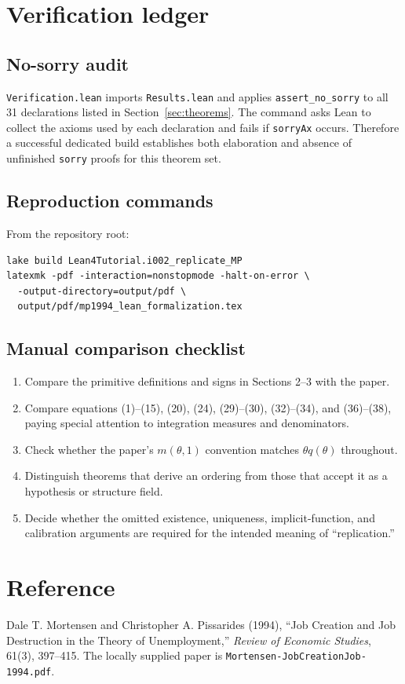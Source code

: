 \documentclass[11pt]{article}
\newcommand{\code}[1]{\texttt{#1}}
\newcommand{\leanfile}[1]{\texttt{#1}}
\begin{document}
\section{Verification ledger}

\subsection{No-sorry audit}

\leanfile{Verification.lean} imports \leanfile{Results.lean} and applies
\code{assert\_no\_sorry} to all 31 declarations listed in
Section~\ref{sec:theorems}. The command asks Lean to collect the axioms used by each
declaration and fails if \code{sorryAx} occurs. Therefore a successful dedicated
build establishes both elaboration and absence of unfinished \code{sorry} proofs for
this theorem set.

\subsection{Reproduction commands}

From the repository root:
\begin{verbatim}
lake build Lean4Tutorial.i002_replicate_MP
latexmk -pdf -interaction=nonstopmode -halt-on-error \
  -output-directory=output/pdf \
  output/pdf/mp1994_lean_formalization.tex
\end{verbatim}

\subsection{Manual comparison checklist}

\begin{enumerate}
  \item Compare the primitive definitions and signs in Sections 2--3 with the paper.
  \item Compare equations (1)--(15), (20), (24), (29)--(30), (32)--(34), and
        (36)--(38), paying special attention to integration measures and denominators.
  \item Check whether the paper's $m(\theta,1)$ convention matches
        $\theta q(\theta)$ throughout.
  \item Distinguish theorems that derive an ordering from those that accept it as a
        hypothesis or structure field.
  \item Decide whether the omitted existence, uniqueness, implicit-function, and
        calibration arguments are required for the intended meaning of ``replication.''
\end{enumerate}

\section*{Reference}

Dale T. Mortensen and Christopher A. Pissarides (1994), ``Job Creation and Job
Destruction in the Theory of Unemployment,'' \emph{Review of Economic Studies},
61(3), 397--415. The locally supplied paper is
\leanfile{Mortensen-JobCreationJob-1994.pdf}.
\end{document}
